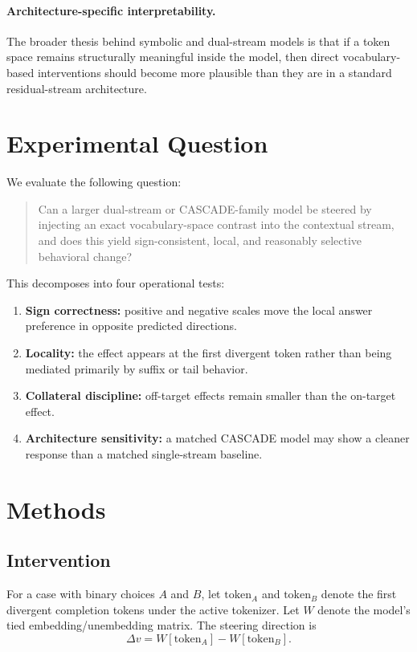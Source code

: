 \documentclass[11pt]{article}
\begin{document}
\paragraph{Architecture-specific interpretability.}
The broader thesis behind symbolic and dual-stream models is that if a token
space remains structurally meaningful inside the model, then direct
vocabulary-based interventions should become more plausible than they are in a
standard residual-stream architecture.

\section{Experimental Question}

We evaluate the following question:

\begin{quote}
Can a larger dual-stream or CASCADE-family model be steered by injecting an
exact vocabulary-space contrast into the contextual stream, and does this yield
sign-consistent, local, and reasonably selective behavioral change?
\end{quote}

This decomposes into four operational tests:

\begin{enumerate}[leftmargin=1.5em]
\item \textbf{Sign correctness:} positive and negative scales move the local
answer preference in opposite predicted directions.
\item \textbf{Locality:} the effect appears at the first divergent token rather
than being mediated primarily by suffix or tail behavior.
\item \textbf{Collateral discipline:} off-target effects remain smaller than
the on-target effect.
\item \textbf{Architecture sensitivity:} a matched CASCADE model may show a
cleaner response than a matched single-stream baseline.
\end{enumerate}

\section{Methods}

\subsection{Intervention}

For a case with binary choices $A$ and $B$, let $\text{token}_A$ and
$\text{token}_B$ denote the first divergent completion tokens under the active
tokenizer. Let $W$ denote the model's tied embedding/unembedding matrix. The
steering direction is
\[
\Delta v = W[\text{token}_A] - W[\text{token}_B].
\]
\end{document}
